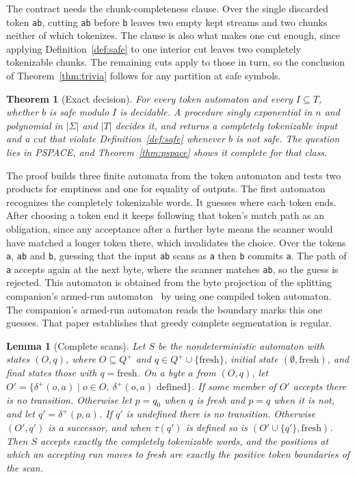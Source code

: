 \documentclass[11pt,a4paper]{article}
\theoremstyle{definition}
\theoremstyle{plain}
\newtheorem{lemma}{Lemma}
\newtheorem{theorem}{Theorem}
\newcommand{\code}[1]{\texttt{#1}}
\begin{document}
The contract needs the chunk-completeness clause. Over the single discarded token \code{ab}, cutting \code{ab} before
\code{b} leaves two empty kept streams and two chunks neither of which tokenizes. The clause is also what makes one cut
enough, since applying Definition~\ref{def:safe} to one interior cut leaves two completely tokenizable chunks. The
remaining cuts apply to those in turn, so the conclusion of Theorem~\ref{thm:trivia} follows for any partition at safe
symbols.

\begin{theorem}[Exact decision]
\label{thm:exact}
For every token automaton and every $I \subseteq T$, whether $b$ is safe modulo $I$ is decidable. A procedure singly
exponential in $n$ and polynomial in $|\Sigma|$ and $|T|$ decides it, and returns a completely tokenizable input and a
cut that violate Definition~\ref{def:safe} whenever $b$ is not safe. The question lies in PSPACE, and
Theorem~\ref{thm:pspace} shows it complete for that class.
\end{theorem}

The proof builds three finite automata from the token automaton and tests two products for emptiness and one for
equality of outputs. The first automaton recognizes the completely tokenizable words. It guesses where each token ends.
After choosing a token end it keeps following that token's match path as an obligation, since any acceptance after a
further byte means the scanner would have matched a longer token there, which invalidates the choice. Over the tokens
\code{a}, \code{ab} and \code{b}, guessing that the input \code{ab} scans as \code{a} then \code{b} commits \code{a}.
The path of \code{a} accepts again at the next byte, where the scanner matches \code{ab}, so the guess is rejected. This
automaton is obtained from the byte projection of the splitting companion's armed-run
automaton~\cite{nidhogg2026certifiedsplitting} by using one compiled token automaton. The companion's armed-run
automaton reads the boundary marks this one guesses. That paper establishes that greedy complete segmentation is
regular.

\begin{lemma}[Complete scans]
\label{lem:complete}
Let $S$ be the nondeterministic automaton with states $(O, q)$, where $O \subseteq Q^+$ and
$q \in Q^+ \cup \{\mathrm{fresh}\}$, initial state $(\emptyset, \mathrm{fresh})$, and final states those with
$q = \mathrm{fresh}$. On a byte $a$ from $(O, q)$, let
$O' = \{\delta^+(o, a) \mid o \in O,\ \delta^+(o, a) \text{ defined}\}$. If some member of $O'$ accepts there is no
transition. Otherwise let $p = q_0$ when $q$ is fresh and $p = q$ when it is not, and let $q' = \delta^+(p, a)$. If $q'$
is undefined there is no transition. Otherwise $(O', q')$ is a successor, and when $\tau(q')$ is defined so is
$(O' \cup \{q'\}, \mathrm{fresh})$. Then $S$ accepts exactly the completely tokenizable words, and the positions at
which an accepting run moves to fresh are exactly the positive token boundaries of the scan.
\end{lemma}
\end{document}
